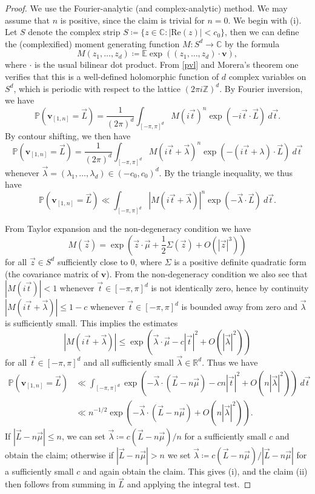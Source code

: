 \documentclass[12pt,a4paper,reqno]{amsart}
\numberwithin{equation}{section}
\theoremstyle{plain}
\theoremstyle{definition}
\renewcommand\P{\mathbb{P}}
\newcommand\E{\mathbb{E}}
\newcommand\R{\mathbb{R}}
\newcommand\Z{\mathbb{Z}}
\renewcommand\v{\mathbf{v}}
\newcommand\C{\mathbb{C}}
\begin{document}
\begin{proof}  We use the Fourier-analytic (and complex-analytic) method.  We may assume that $n$ is positive, since the claim is trivial for $n=0$.
We begin with (i).  Let $S$ denote the complex strip $S \coloneqq \{ z \in \C: |\mathrm{Re}(z)| < c_0 \}$, then we can define the (complexified) moment generating function $M \colon S^d \to \C$ by the formula
$$ M(z_1,\dots,z_d) \coloneqq \E \exp( (z_1,\dots,z_d) \cdot \v ),$$
where $\cdot$ is the usual bilinear dot product.
From \eqref{pvl} and Morera's theorem one verifies that this is a well-defined holomorphic function of $d$ complex variables on $S^d$, which is periodic with respect to the lattice $(2\pi i\Z)^d$.  By Fourier inversion, we have
$$ \P( \v_{[1,n]} = \vec L) = \frac{1}{(2\pi)^d} \int_{[-\pi,\pi]^d} M\left( i\vec t \right)^n \exp\left( - i \vec t \cdot \vec L \right)\ d\vec t.$$
By contour shifting, we then have
$$ \P( \v_{[1,n]} = \vec L) = \frac{1}{(2\pi)^d} \int_{[-\pi,\pi]^d} M\left( i\vec t + \vec \lambda\right)^n \exp\left( - (i\vec t + \lambda) \cdot \vec L \right)\ d\vec t$$
 whenever $\vec \lambda = (\lambda_1,\dots,\lambda_d) \in (-c_0,c_0)^d$. By the triangle inequality, we thus have
$$ \P( \v_{[1,n]} = \vec L) \ll \int_{[-\pi,\pi]^d} \left|M\left( i\vec t + \vec \lambda\right)\right|^n \exp\left( - \vec \lambda \cdot \vec L \right)\ d\vec t.$$

From Taylor expansion and the non-degeneracy condition we have 
$$ M(\vec z) = \exp\left( \vec z \cdot \vec \mu + \frac{1}{2} \Sigma(\vec z) + O(|\vec z|^3) \right)$$
for all $\vec z \in S^d$ sufficiently close to $0$, where $\Sigma$ is a positive definite quadratic form (the covariance matrix of $\v$).  From the non-degeneracy condition we also see that $|M(i\vec t)| < 1$ whenever $\vec t \in [-\pi,\pi]^d$ is not identically zero, hence by continuity $|M(i\vec t + \vec \lambda)| \leq 1-c$ whenever $\vec t \in [-\pi,\pi]^d$ is bounded away from zero and $\vec \lambda$ is sufficiently small.  This implies the estimates
$$ |M(i\vec t + \vec \lambda )| \leq \exp\left( \vec \lambda \cdot \vec \mu - c |\vec t|^2 + O( |\vec \lambda|^2) \right)$$
for all $\vec t \in [-\pi,\pi]^d$ and all sufficiently small $\vec \lambda \in \R^d$.  Thus we have
\begin{align*}
 \P( \v_{[1,n]} = \vec L) &\ll \int_{[-\pi,\pi]^d} \exp\left( - \vec \lambda \cdot (\vec L-n\vec \mu) - c n|\vec t|^2 + O( n |\vec \lambda|^2 ) \right)\ d\vec t \\
&\ll n^{-1/2} \exp\left( - \vec \lambda \cdot (\vec L-n\vec \mu) + O( n |\vec \lambda|^2 ) \right).
\end{align*}
If $|\vec L-n\vec \mu| \leq n$, we can set $\vec \lambda \coloneqq c(\vec L-n\vec \mu) / n$ for a sufficiently small $c$ and obtain the claim; otherwise if $|\vec L-n\vec \mu| > n$ we set $\vec \lambda \coloneqq c(\vec L-n\vec \mu)/|\vec L-n\vec \mu|$ for a sufficiently small $c$ and again obtain the claim.  This gives (i), and the claim (ii) then follows from summing in $\vec L$ and applying the integral test.
\end{proof}
\end{document}
